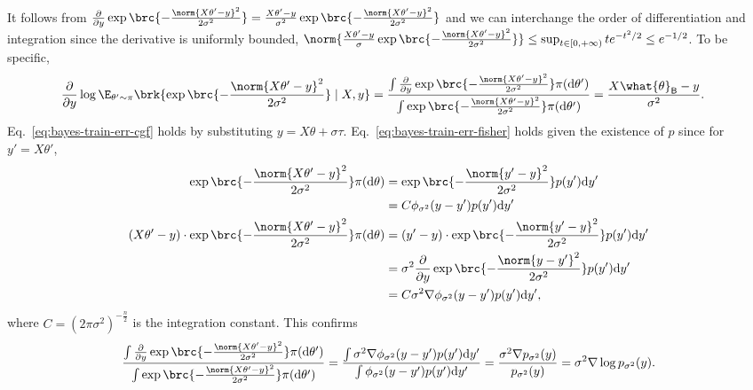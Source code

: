 \documentclass[11pt]{article}
\newcommand{\bysest}{\what{\theta}_{\mathsf{B}}}
\newcommand{\de}{\mathrm{d}}
\begin{document}
It follows from $\frac{\partial}{\partial y} \exp \brc{-\frac{\norm{X \theta' - y}^2}{2 \sigma^2}} = \frac{X \theta' -y}{\sigma^2} \exp \brc{-\frac{\norm{X \theta' - y}^2}{2\sigma^2}}$ and we can interchange the order of differentiation and integration since the derivative is uniformly bounded, $\norm{\frac{X \theta' -y}{\sigma} \exp \brc{-\frac{\norm{X \theta' - y}^2}{2\sigma^2}}} \leq \sup_{t \in [0,+\infty)} t e^{-t^2/2} \leq e^{-1/2}$. To be specific,
    \begin{align*}
        \frac{\partial}{\partial y} \log \E_{\theta' \sim \pi} \brk{\exp \brc{-\frac{\norm{X \theta' - y}^2}{2 \sigma^2}} \mid X, y} & = \frac{\int \frac{\partial}{\partial y} \exp \brc{-\frac{\norm{X \theta' - y}^2}{2 \sigma^2}} \pi(\de \theta') }{\int \exp \brc{-\frac{\norm{X \theta' - y}^2}{2 \sigma^2}} \pi(\de \theta') }  = \frac{X \bysest - y}{\sigma^2}.
    \end{align*}
    Eq.~\eqref{eq:bayes-train-err-cgf} holds by substituting $y=X\theta + \sigma \tau$. Eq.~\eqref{eq:bayes-train-err-fisher} holds given the existence of $p$ since for $y'=X\theta'$,
    \begin{align*}
    \exp \brc{-\frac{\norm{X \theta' - y}^2}{2 \sigma^2}} \pi(\de \theta) & = \exp \brc{-\frac{\norm{y' - y}^2}{2 \sigma^2}} p(y') \de y' \nonumber \\
    & = C \phi_{\sigma^2}(y-y') p(y') \de y' \nonumber \\
    (X \theta' - y) \cdot \exp \brc{-\frac{\norm{X \theta' - y}^2}{2 \sigma^2}} \pi(\de \theta) & = (y' - y) \cdot \exp \brc{-\frac{\norm{y' - y}^2}{2 \sigma^2}} p(y') \de y' \nonumber \\
    & = \sigma^2 \frac{\partial}{\partial y} \exp \brc{-\frac{\norm{y-y'}^2}{2 \sigma^2}} p(y') \de y' \nonumber \\
    & = C\sigma^2 \nabla \phi_{\sigma^2}(y-y') p(y') \de y',
    \end{align*}
    where $C = (2\pi \sigma^2)^{-\frac{n}{2}}$ is the integration constant. This confirms
    \begin{align*}
        \frac{\int \frac{\partial}{\partial y} \exp \brc{-\frac{\norm{X \theta' - y}^2}{2 \sigma^2}} \pi(\de \theta') }{\int \exp \brc{-\frac{\norm{X \theta' - y}^2}{2 \sigma^2}} \pi(\de \theta') } = \frac{\int \sigma^2 \nabla  \phi_{\sigma^2}(y-y') p(y') \de y' }{\int \phi_{\sigma^2}(y-y') p(y') \de y' } = \frac{\sigma^2 \nabla  p_{\sigma^2}(y) }{p_{\sigma^2}(y) }  = \sigma^2 \nabla \log p_{\sigma^2}(y).
    \end{align*}
\end{document}
